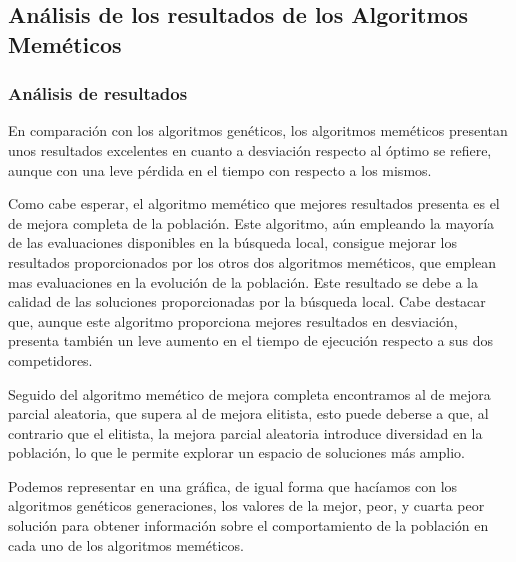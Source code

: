 \documentclass[11pt,a4paper]{article}
\begin{document}
	\subsection{Análisis de los resultados de los Algoritmos Meméticos}
	
	\subsubsection{Análisis de resultados}
	
	\noindent En comparación con los algoritmos genéticos, los algoritmos meméticos presentan unos resultados excelentes en cuanto a desviación respecto al óptimo se refiere, aunque con una leve pérdida en el tiempo con respecto a los mismos.
	
	\noindent Como cabe esperar, el algoritmo memético que mejores resultados presenta es el de mejora completa de la población. Este algoritmo, aún empleando la mayoría de las evaluaciones disponibles en la búsqueda local, consigue mejorar los resultados proporcionados por los otros dos algoritmos meméticos, que emplean mas evaluaciones en la evolución de la población. Este resultado se debe a la calidad de las soluciones proporcionadas por la búsqueda local. Cabe destacar que, aunque este algoritmo proporciona mejores resultados en desviación, presenta también un leve aumento en el tiempo de ejecución respecto a sus dos competidores.
	
	\noindent Seguido del algoritmo memético de mejora completa encontramos al de mejora parcial aleatoria, que supera al de mejora elitista, esto puede deberse a que, al contrario que el elitista, la mejora parcial aleatoria introduce diversidad en la población, lo que le permite explorar un espacio de soluciones más amplio.
	
	\noindent Podemos representar en una gráfica, de igual forma que hacíamos con los algoritmos genéticos generaciones, los valores de la mejor, peor, y cuarta peor solución para obtener información sobre el comportamiento de la población en cada uno de los algoritmos meméticos.
	
\end{document}
